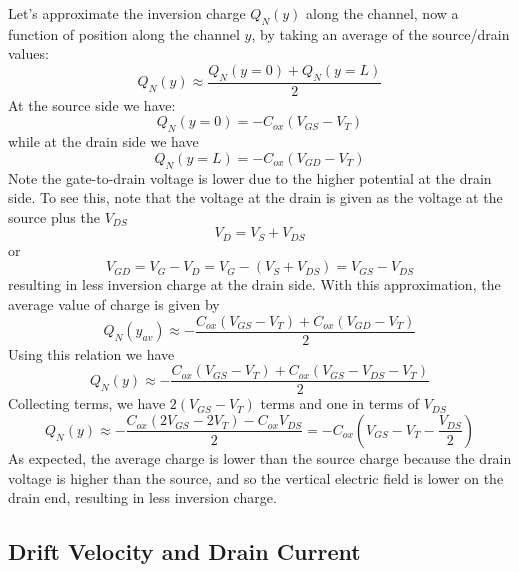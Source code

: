 Let's approximate the  inversion charge $Q_N(y)$ along the channel, now a function of position along the channel $y$, by taking an average of the source/drain values:
%
\begin{equation} 
	{Q_N}(y) \approx \frac{{Q_N}(y = 0) + {Q_N}(y = L)}{2} 
\end{equation}
%
At the source side we have:
%
\begin{equation} 
	{Q_N}(y = 0) =  - {C_{ox}}({V_{GS}} - {V_T}) 
\end{equation}
%
while at the drain side we have
%
\begin{equation} 
	{Q_N}(y = L) =  - {C_{ox}}({V_{GD}} - {V_T}) 
\end{equation}
%
Note the gate-to-drain voltage is lower due to the higher potential at the drain side.  To see this, note that 
the voltage at the drain is given as the voltage at the source plus the $V_{DS}$
\[
	V_D = V_S + V_{DS}
\]
or
\[
	V_{GD} = V_{G} - V_{D} = V_{G} - (V_S + V_{DS}) = V_{GS} - V_{DS} 
\]
%
resulting in less inversion charge at the drain side.  With this approximation, the average value of charge is given by
\begin{equation}
	{Q_N}(y_{av}) \approx  - \frac{{{C_{ox}}({V_{GS}} - {V_T}) + {C_{ox}}({V_{GD}} - {V_T})}}{2}
\end{equation}
%
Using this relation we have
\begin{equation}
	{Q_N}(y) \approx  - \frac{{{C_{ox}}({V_{GS}} - {V_T}) + {C_{ox}}({V_{GS}} - {V_{DS}} - {V_T})}}{2}
\end{equation}
%
Collecting terms, we have $2(V_{GS} - V_T)$ terms and one in terms of $V_{DS}$
%
\begin{equation}
	{Q_N}(y) \approx  - \frac{{{C_{ox}}(2{V_{GS}} - 2{V_T}) - {C_{ox}}{V_{DS}}}}{2} =  - {C_{ox}}({V_{GS}} - {V_T} - \frac{{{V_{DS}}}}{2})
\end{equation}
%
As expected, the average charge is lower than the source charge because the drain voltage is higher than the source, and so the vertical electric field is lower on the drain end, resulting in less inversion charge.
 



\subsection{Drift Velocity and Drain Current}

